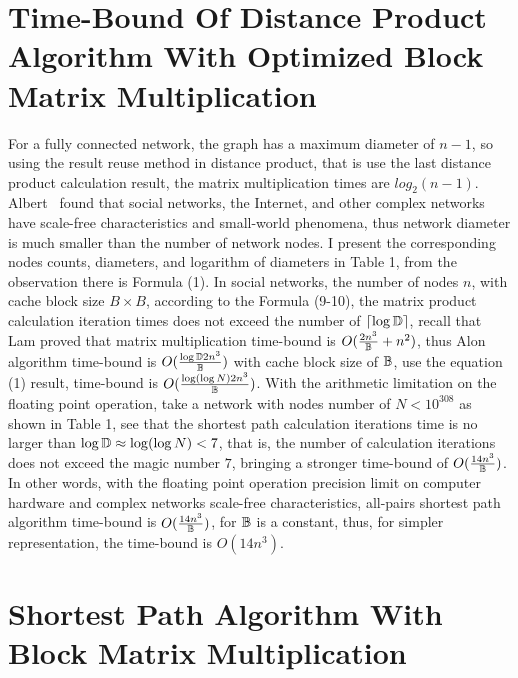\documentclass[10pt,twocolumn,letterpaper]{article}
\begin{document}

\section{Time-Bound Of Distance Product Algorithm With Optimized Block Matrix Multiplication}

For a fully connected network, the graph has a maximum diameter of $n-1$, so using the result reuse method in distance product, that is use the last distance product calculation result, the matrix multiplication times are $log_2(n-1)$.
Albert~\cite{albert1999diameter} found that social networks, the Internet, and other complex networks have scale-free characteristics and small-world phenomena, thus network diameter is much smaller than the number of network nodes.
I present the corresponding nodes counts, diameters, and logarithm of diameters in Table 1, from the observation there is Formula (1).
In social networks, the number of nodes $n$, with cache block size $B\times B$, according to the Formula (9-10), the matrix product calculation iteration times does not exceed the number of $\lceil{\log{\Bbb D}}\rceil$, recall that Lam \etal proved that matrix multiplication time-bound is \(O({2n^3 \over \Bbb B}+{n^2})\),
thus Alon \etal algorithm time-bound is \(O({\log{\Bbb D}2n^3\over{ \Bbb B}})\) with cache block size of $\Bbb B$, use the equation (1) result, time-bound is \(O({\log(\log{N})2n^3\over \Bbb B})\).
With the arithmetic limitation on the floating point operation, \eg take a network with nodes number of $N<10^{308}$
as shown in Table 1, see that the shortest path calculation iterations time is no larger than $\log{\Bbb D} \approx \log(\log{N})<7$, that is, the number of calculation iterations does not exceed the magic number $7$,
bringing a stronger time-bound of \(O({14n^3\over {\Bbb B}})\).
In other words, with the floating point operation precision limit on computer hardware and complex networks scale-free characteristics, all-pairs shortest path algorithm time-bound is \(O({14n^3\over \Bbb B})\), for $\Bbb B$ is a constant, thus, for simpler representation, the time-bound is \(O(14n^3)\).




\section{Shortest Path Algorithm With Block Matrix Multiplication}
\end{document}
